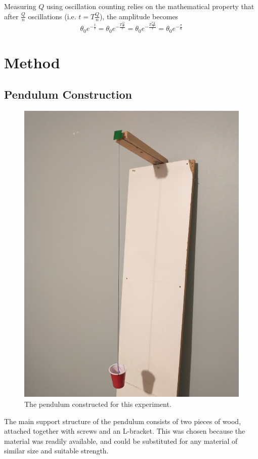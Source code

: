 \documentclass[aps,twocolumn,secnumarabic,nobalancelastpage,amsmath,amssymb,nofootinbib,letterpaper]{revtex4}
\begin{document}
Measuring \(Q\) using oscillation counting relies on the mathematical property that after \(\frac{Q}{n}\) oscillations
(i.e. \(t = T\frac{Q}{n}\)), the amplitude becomes
\begin{equation}
    \theta_0 e^{-\frac{t}{\tau}} = \theta_0 e^{-\frac{T\frac{Q}{n}}{\tau}} = \theta_0 e^{-\frac{T\frac{\pi\frac{\tau}{T}}{n}}{\tau}} = \theta_0 e^{-\frac{\pi}{n}}
\end{equation}


\section{Method}

\subsection{Pendulum Construction}

\begin{figure}[htb]
    \includegraphics[width=0.6\linewidth]{pendulum.png}
    \caption{The pendulum constructed for this experiment.}
\end{figure}

The main support structure of the pendulum consists of two pieces of wood, attached together with screws and an
L-bracket. This was chosen because the material was readily available, and could be substituted for any material of
similar size and suitable strength.
\end{document}
